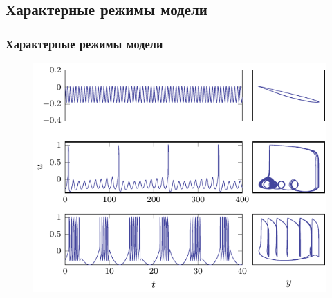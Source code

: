 \subsection{Характерные режимы модели}
\begin{frame}%
	\frametitle{Характерные режимы модели}
	\begin{figure}[h]
		\hspace{0em}
		\includegraphics[scale=1]{img/img_4}
	\end{figure}
	
\end{frame}
